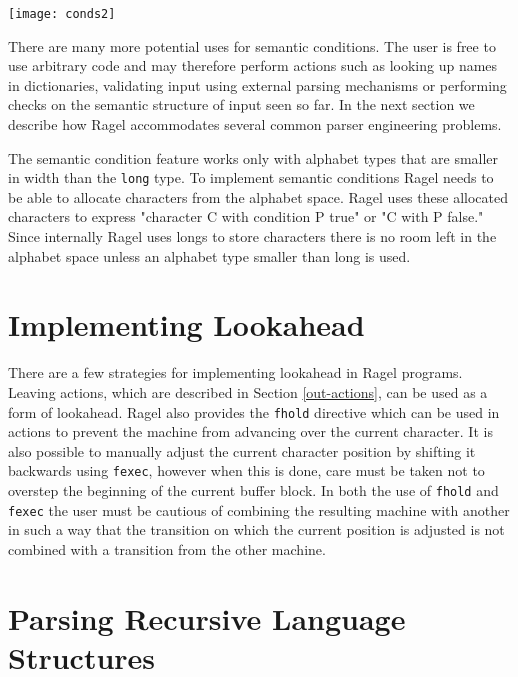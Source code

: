 \documentclass[letterpaper,11pt,oneside]{book}
\newcommand{\graphspace}{\vspace{10pt}}
\begin{document}
\graphspace
\begin{center}
\texttt{[image: conds2]}
\end{center}
\graphspace

There are many more potential uses for semantic conditions. The user is free to
use arbitrary code and may therefore perform actions such as looking up names
in dictionaries, validating input using external parsing mechanisms or
performing checks on the semantic structure of input seen so far. In the
next section we describe how Ragel accommodates several common parser
engineering problems.

\vspace{10pt}

 The semantic condition feature works only with
alphabet types that are smaller in width than the \verb|long| type. To
implement semantic conditions Ragel needs to be able to allocate characters
from the alphabet space. Ragel uses these allocated characters to express
"character C with condition P true" or "C with P false." Since internally Ragel
uses longs to store characters there is no room left in the alphabet space
unless an alphabet type smaller than long is used.

\section{Implementing Lookahead}

There are a few strategies for implementing lookahead in Ragel programs.
Leaving actions, which are described in Section \ref{out-actions}, can be
used as a form of lookahead.  Ragel also provides the \verb|fhold| directive
which can be used in actions to prevent the machine from advancing over the
current character. It is also possible to manually adjust the current character
position by shifting it backwards using \verb|fexec|, however when this is
done, care must be taken not to overstep the beginning of the current buffer
block. In both the use of \verb|fhold| and \verb|fexec| the user must be
cautious of combining the resulting machine with another in such a way that the
transition on which the current position is adjusted is not combined with a
transition from the other machine.

\section{Parsing Recursive Language Structures}
\end{document}
